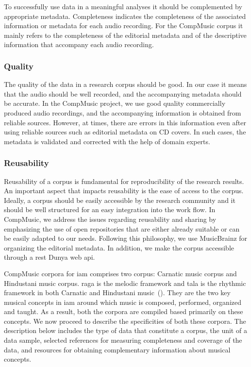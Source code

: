 To successfully use data in a meaningful analyses it should be complemented by appropriate metadata. Completeness indicates the completeness of the associated information or metadata for each audio recording. For the CompMusic corpus it mainly refers to the completeness of the editorial metadata and of the descriptive information that accompany each audio recording. 

\subsubsection{Quality}

The quality of the data in a research corpus should be good. In our case it means that the audio should be well recorded, and the accompanying metadata should be accurate. In the CompMusic project, we use good quality commercially produced audio recordings, and the accompanying information is obtained from reliable sources. However, at times, there are errors in this information even after using reliable sources such as editorial metadata on CD covers. In such cases, the metadata is validated and corrected with the help of domain experts. 

\subsubsection{Reusability}

Reusability of a corpus is fundamental for reproducibility of the research results. An important aspect that impacts reusability is the ease of access to the corpus. Ideally, a corpus should be easily accessible by the research community and it should be well structured for an easy integration into the work flow. In CompMusic, we address the issues regarding reusability and sharing by emphasizing the use of open repositories that are either already suitable or can be easily adapted to our needs. Following this philosophy, we use MusicBrainz for organizing the editorial metadata. In addition, we make the corpus accessible through a \acrshort{rest} Dunya web \gls{api}.

CompMusic corpora for \gls{iam} comprises two corpus: Carnatic music corpus and Hindustani music corpus. \Gls{raga} is the melodic framework and \gls{tala} is the rhythmic framework in both Carnatic and Hindustani music~(). They are the two key musical concepts in \gls{iam} around which music is composed, performed, organized and taught. As a result, both the corpora are compiled based primarily on these concepts. We now proceed to describe the specificities of both these corpora. The description below includes the type of data that constitute a corpus, the unit of a data sample, selected references for measuring completeness and coverage of the data, and resources for obtaining complementary information about musical concepts. 


